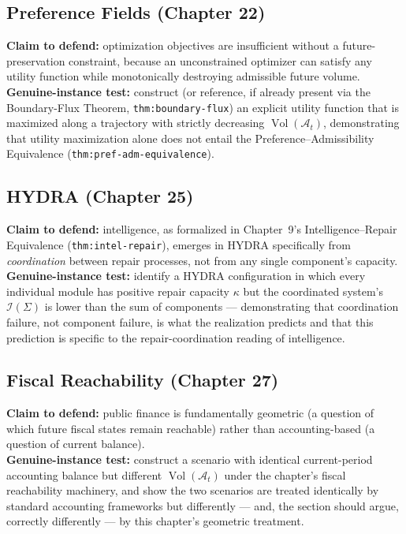 \documentclass[11pt]{report}
\newcommand{\adm}{\mathcal{A}}
\newcommand{\Vol}{\operatorname{Vol}}
\begin{document}
\subsection*{Preference Fields (Chapter 22)}
\textbf{Claim to defend:} optimization objectives are
insufficient without a future-preservation constraint, because
an unconstrained optimizer can satisfy any utility function
while monotonically destroying admissible future volume.\\
\textbf{Genuine-instance test:} construct (or reference, if
already present via the Boundary-Flux Theorem,
\texttt{thm:boundary-flux}) an explicit utility function that is
maximized along a trajectory with strictly decreasing
$\Vol(\adm_t)$, demonstrating that utility maximization alone
does not entail the Preference--Admissibility Equivalence
(\texttt{thm:pref-adm-equivalence}).

\subsection*{HYDRA (Chapter 25)}
\textbf{Claim to defend:} intelligence, as formalized in
Chapter~9's Intelligence--Repair Equivalence
(\texttt{thm:intel-repair}), emerges in HYDRA specifically from
\emph{coordination} between repair processes, not from any
single component's capacity.\\
\textbf{Genuine-instance test:} identify a HYDRA configuration
in which every individual module has positive repair capacity
$\kappa$ but the coordinated system's $\mathcal{I}(\Sigma)$ is
lower than the sum of components --- demonstrating that
coordination failure, not component failure, is what the
realization predicts and that this prediction is specific to
the repair-coordination reading of intelligence.

\subsection*{Fiscal Reachability (Chapter 27)}
\textbf{Claim to defend:} public finance is fundamentally
geometric (a question of which future fiscal states remain
reachable) rather than accounting-based (a question of current
balance).\\
\textbf{Genuine-instance test:} construct a scenario with
identical current-period accounting balance but different
$\Vol(\adm_t)$ under the chapter's fiscal reachability
machinery, and show the two scenarios are treated identically
by standard accounting frameworks but differently --- and, the
section should argue, correctly differently --- by this
chapter's geometric treatment.
\end{document}
